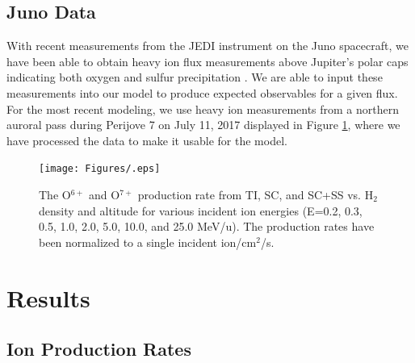 \documentclass[draft]{agujournal2018}
\begin{document}
\subsection{Juno Data}

With recent measurements from the JEDI instrument \citep{mauk2017ssr} on the Juno spacecraft, we have been able to obtain heavy ion flux measurements above Jupiter's polar caps indicating both oxygen and sulfur precipitation \citep{haggerty2017,clark2017a,clark2017b}.
We are able to input these measurements into our model to produce expected observables for a given flux.
For the most recent modeling, we use heavy ion measurements from a northern auroral pass during Perijove 7 on July 11, 2017 displayed in Figure \ref{fig:JEDIFlux}, where we have processed the data to make it usable for the model.

\begin{figure}[ht]
    \centering
    \texttt{[image: Figures/.eps]}
    \caption{The O$^{6+}$ and O$^{7+}$ production rate from TI, SC, and SC+SS vs. H$_2$ density and altitude for various incident ion energies (E=0.2, 0.3, 0.5, 1.0, 2.0, 5.0, 10.0, and 25.0 MeV/u). The production rates have been normalized to a single incident ion/cm$^2$/s.}
    \label{fig:JEDIFlux}
\end{figure}


\section{Results}

\subsection{Ion Production Rates}
\end{document}
